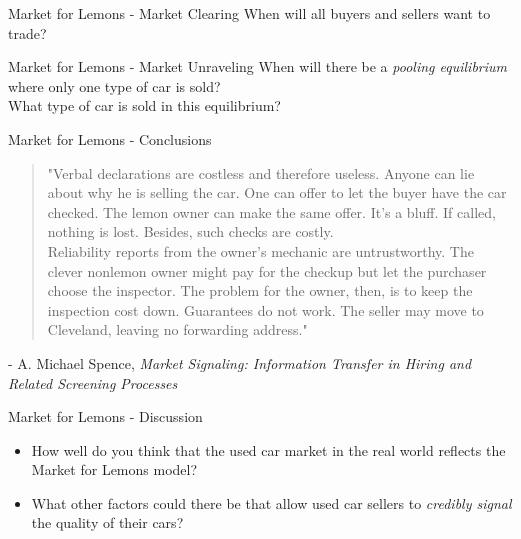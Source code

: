 
\begin{frame}{Market for Lemons - Market Clearing}
  When will all buyers and sellers want to trade?
  \vspace{30mm}
\end{frame}


\begin{frame}{Market for Lemons - Market Unraveling}
  When will there be a \textit{pooling equilibrium}
  where only one type of car is sold?
  \vspace{30mm} \\
  What type of car is sold in this equilibrium?
\end{frame}



\begin{frame}{Market for Lemons - Conclusions}
  \begin{quote}
    \small{
    "Verbal declarations are costless and therefore useless. Anyone can lie about why he is selling the car. 
    One can offer to let the buyer have the car checked. The lemon owner can make the same offer. It’s a bluff. If called, nothing is lost. Besides, such checks are costly. \\
    Reliability reports from the owner’s mechanic are untrustworthy. The clever nonlemon owner might pay for the checkup but let the purchaser choose the inspector. The problem for the owner, then, is to keep the inspection cost down. 
    Guarantees do not work. The seller may move to Cleveland, leaving no forwarding address." 
    }
  \end{quote} 
   \footnotesize{- A. Michael Spence, \textit{Market Signaling: Information Transfer in Hiring and Related Screening Processes}}
\end{frame}


\begin{frame}{Market for Lemons - Discussion}
  \begin{itemize}
  \item How well do you think that the used car market in the real world  
  reflects the Market for Lemons model?
  \item What other factors could there be that allow used car sellers 
  to \textit{credibly signal} the quality of their cars?
  \end{itemize}
\end{frame}
